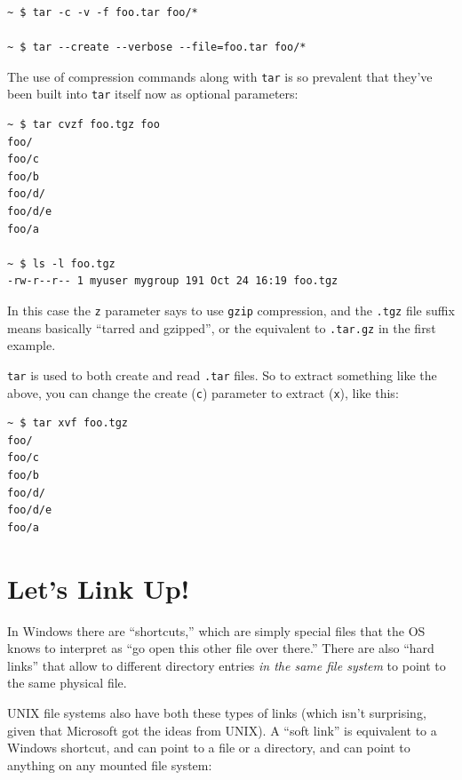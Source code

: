 \documentclass[10pt,]{book}
\numberwithin{figure}{chapter}
\begin{document}
\begin{verbatim}
~ $ tar -c -v -f foo.tar foo/*

~ $ tar --create --verbose --file=foo.tar foo/*
\end{verbatim}

The use of compression commands along with \texttt{tar} is so prevalent
that they've been built into \texttt{tar} itself now as optional
parameters:

\begin{verbatim}
~ $ tar cvzf foo.tgz foo
foo/
foo/c
foo/b
foo/d/
foo/d/e
foo/a

~ $ ls -l foo.tgz
-rw-r--r-- 1 myuser mygroup 191 Oct 24 16:19 foo.tgz
\end{verbatim}

In this case the \texttt{z} parameter says to use \texttt{gzip}
compression, and the \texttt{.tgz} file suffix means basically ``tarred
and gzipped'', or the equivalent to \texttt{.tar.gz} in the first
example.

\texttt{tar} is used to both create and read \texttt{.tar} files. So to
extract something like the above, you can change the create (\texttt{c})
parameter to extract (\texttt{x}), like this:

\begin{verbatim}
~ $ tar xvf foo.tgz
foo/
foo/c
foo/b
foo/d/
foo/d/e
foo/a
\end{verbatim}

\section{Let's Link Up!}\label{lets-link-up}

In Windows there are ``shortcuts,'' which are simply special files that
the OS knows to interpret as ``go open this other file over there.''
There are also ``hard links'' that allow to different directory entries
\emph{in the same file system} to point to the same physical file.

UNIX file systems also have both these types of links (which isn't
surprising, given that Microsoft got the ideas from UNIX). A ``soft
link'' is equivalent to a Windows shortcut, and can point to a file or a
directory, and can point to anything on any mounted file system:
\end{document}
